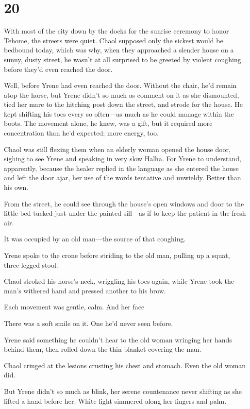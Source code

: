 
\chapter{20}

With most of the city down by the docks for the sunrise ceremony to honor Tehome, the streets were quiet.
Chaol supposed only the sickest would be bedbound today, which was why, when they approached a slender house on a sunny, dusty street, he wasn't at all surprised to be greeted by violent coughing before they'd even reached the door.

Well, before Yrene had even reached the door.
Without the chair, he'd remain atop the horse, but Yrene didn't so much as comment on it as she dismounted, tied her mare to the hitching post down the street, and strode for the house.
He kept shifting his toes every so often---as much as he could manage within the boots.
The movement alone, he knew, was a gift, but it required more concentration than he'd expected; more energy, too.

Chaol was still flexing them when an elderly woman opened the house door, sighing to see Yrene and speaking in very slow Halha.
For Yrene to understand, apparently, because the healer replied in the language as she entered the house and left the door ajar, her use of the words tentative and unwieldy.
Better than his own.

From the street, he could see through the house's open windows and door to the little bed tucked just under the painted sill---as if to keep the patient in the fresh air.

It was occupied by an old man---the source of that coughing.

Yrene spoke to the crone before striding to the old man, pulling up a squat, three-legged stool.

Chaol stroked his horse's neck, wriggling his toes again, while Yrene took the man's withered hand and pressed another to his brow.

Each movement was gentle, calm.
And her face 

There was a soft smile on it.
One he'd never seen before.

Yrene said something he couldn't hear to the old woman wringing her hands behind them, then rolled down the thin blanket covering the man.

Chaol cringed at the lesions crusting his chest and stomach.
Even the old woman did.

But Yrene didn't so much as blink, her serene countenance never shifting as she lifted a hand before her.
White light simmered along her fingers and palm.

